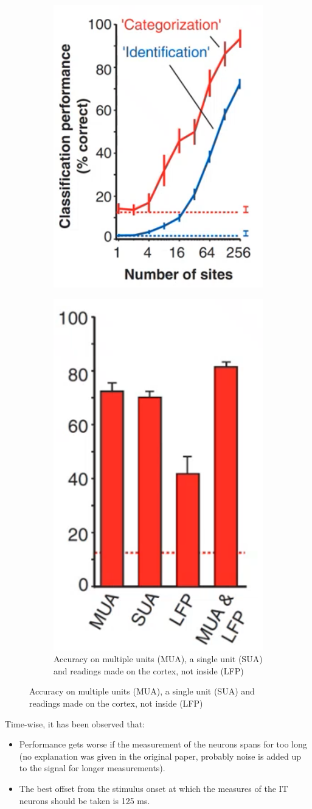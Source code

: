 \begin{casestudy}
    \begin{figure}[H]
        \centering
        \begin{subfigure}{0.3\linewidth}
            \centering
            \includegraphics[width=0.65\linewidth]{./img/monkey_svm_results.png}
        \end{subfigure}
        \begin{subfigure}{0.6\linewidth}
            \centering
            \includegraphics[width=0.25\linewidth]{./img/monkey_svm_results2.png}
            \caption{Accuracy on multiple units (MUA), a single unit (SUA) and readings made on the cortex, not inside (LFP)}
        \end{subfigure}
    \end{figure}

    Time-wise, it has been observed that:
    \begin{itemize}
        \item Performance gets worse if the measurement of the neurons spans for too long 
            (no explanation was given in the original paper, probably noise is added up to the signal for longer measurements).
        \item The best offset from the stimulus onset at which the measures of the IT neurons should be taken is 125 ms.
    \end{itemize}


\end{casestudy}
